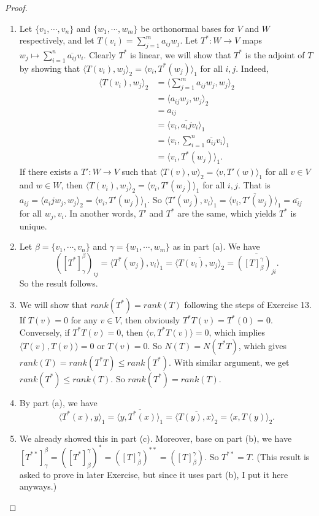 \documentclass[12pt, a4paper]{article}
\theoremstyle{plain}
\begin{document}
	\begin{proof}
	\hfill
	\begin{enumerate}[label=(\alph*)]
	\item Let $\{v_1,\cdots,v_n\}$ and $\{w_1,\cdots,w_m\}$ be orthonormal bases for $V$ and $W$ respectively, and let $T(v_i)=\sum_{j=1}^{m}{a_{ij}w_j}$. Let $T^*:W\rightarrow V$ maps $w_j\mapsto \sum_{i=1}^{n}{\overline{a_{ij}}v_i}$. Clearly $T^*$ is linear, we will show that $T^*$ is the adjoint of $T$ by showing that $\langle{T(v_i),w_j}\rangle_2 = \langle{v_i,T^*(w_j)}\rangle_1$ for all $i,j$. Indeed,
	\begin{align*}
	\langle{T(v_i),w_j}\rangle_2 &= \langle{\sum_{j=1}^{m}{a_{ij}w_j},w_j}\rangle_2\\
	&= \langle{a_{ij}w_j,w_j}\rangle_2\\
	& = a_{ij}\\
	&= \langle{v_i, \overline{a_ij} v_i}\rangle_1\\
	&= \langle{v_i, \sum_{i=1}^{n}{\overline{a_{ij}}v_i}}\rangle_1\\
	& = \langle{v_i,T^*(w_j)}\rangle_1.
	\end{align*}
	If there exists a $T':W\rightarrow V$ such that $\langle{T(v),w}\rangle_2 = \langle{v,T'(w)}\rangle_1$ for all $v\in V$ and $w\in W$, then $\langle{T(v_i),w_j}\rangle_2 = \langle{v_i,T'(w_j)}\rangle_1$ for all $i,j$. That is $a_{ij}=\langle{a_ij w_j,w_j}\rangle_2 = \langle{v_i,T'(w_j)}\rangle_1$. So $\langle{T'(w_j),v_i}\rangle_1 = \overline{\langle{v_i,T'(w_j)}\rangle_1} = \overline{a_{ij}}$ for all $w_j,v_i$. In another words, $T'$ and $T^*$ are the same, which yields $T^*$ is unique.
	\item Let $\beta = \{v_1,\cdots,v_n\}$ and $\gamma = \{w_1,\cdots,w_m\}$ as in part (a). We have
	\[
	([T^*]_\gamma^\beta)_{ij} = \langle{T^*(w_j),v_i}\rangle_1 = \overline{\langle{T(v_i),w_j}\rangle_2} = \overline{([T]_\beta^\gamma)_{ji}}.
	\]
	So the result follows.
	\item We will show that $rank(T^*)=rank(T)$ following the steps of Exercise 13. If $T(v)=0$ for any $v\in V$, then obviously $T^*T(v)=T^*(0)=0$. Conversely, if $T^*T(v)=0$, then $\langle{v,T^*T(v)}\rangle = 0$, which implies $\langle{T(v),T(v)}\rangle = 0$ or $T(v)=0$. So $N(T)=N(T^*T)$, which gives $rank(T)=rank(T^*T)\leq rank(T^*)$. With similar argument, we get $rank(T^*)\leq rank(T)$. So $rank(T^*)=rank(T)$.
	\item By part (a), we have 
	\[
	\langle{T^*(x),y}\rangle_1 = \overline{\langle{y,T^*(x)}\rangle_1} = \overline{\langle{T(y),x}\rangle_2} = \langle{x,T(y)}\rangle_2.
	\]
	\item We already showed this in part (c). Moreover, base on part (b), we have $[T^{**}]_\gamma^\beta = ([T^*]_\beta^\gamma)^* = ([T]_\beta^\gamma)^{**}=([T]_\beta^\gamma)$. So $T^{**}=T$. (This result is asked to prove in later Exercise, but since it uses part (b), I put it here anyways.)
	\end{enumerate}
	\end{proof}
\end{document}
